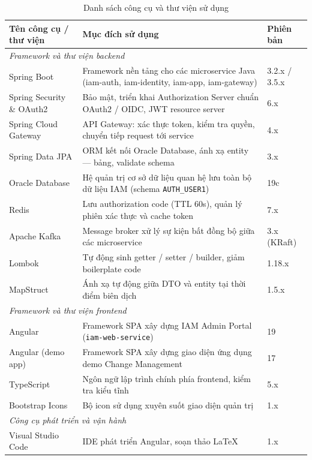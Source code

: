 \documentclass[../DoAn.tex]{subfiles}
\begin{document}
\begin{table}[H]
\centering
\caption{Danh sách công cụ và thư viện sử dụng}
\label{tab:tools-used}
\footnotesize
\begin{tabular}{|p{3.5cm}|p{7.0cm}|p{2.5cm}|}
\hline
\textbf{Tên công cụ / thư viện} & \textbf{Mục đích sử dụng} & \textbf{Phiên bản} \\ \hline
\multicolumn{3}{|l|}{\textit{Framework và thư viện backend}} \\ \hline
Spring Boot & Framework nền tảng cho các microservice Java (iam-auth, iam-identity, iam-app, iam-gateway) & 3.2.x / 3.5.x \\ \hline
Spring Security \& OAuth2 & Bảo mật, triển khai Authorization Server chuẩn OAuth2 / OIDC, JWT resource server & 6.x \\ \hline
Spring Cloud Gateway & API Gateway: xác thực token, kiểm tra quyền, chuyển tiếp request tới service & 4.x \\ \hline
Spring Data JPA & ORM kết nối Oracle Database, ánh xạ entity — bảng, validate schema & 3.x \\ \hline
Oracle Database & Hệ quản trị cơ sở dữ liệu quan hệ lưu toàn bộ dữ liệu IAM (schema \texttt{AUTH\_USER1}) & 19c \\ \hline
Redis & Lưu authorization code (TTL 60s), quản lý phiên xác thực và cache token & 7.x \\ \hline
Apache Kafka & Message broker xử lý sự kiện bất đồng bộ giữa các microservice & 3.x (KRaft) \\ \hline
Lombok & Tự động sinh getter / setter / builder, giảm boilerplate code & 1.18.x \\ \hline
MapStruct & Ánh xạ tự động giữa DTO và entity tại thời điểm biên dịch & 1.5.x \\ \hline
\multicolumn{3}{|l|}{\textit{Framework và thư viện frontend}} \\ \hline
Angular & Framework SPA xây dựng IAM Admin Portal (\texttt{iam-web-service}) & 19 \\ \hline
Angular (demo app) & Framework SPA xây dựng giao diện ứng dụng demo Change Management & 17 \\ \hline
TypeScript & Ngôn ngữ lập trình chính phía frontend, kiểm tra kiểu tĩnh & 5.x \\ \hline
Bootstrap Icons & Bộ icon sử dụng xuyên suốt giao diện quản trị & 1.x \\ \hline
\multicolumn{3}{|l|}{\textit{Công cụ phát triển và vận hành}} \\ \hline
Visual Studio Code & IDE phát triển Angular, soạn thảo LaTeX & 1.x \\ \hline

\end{tabular}
\end{table}
\end{document}
